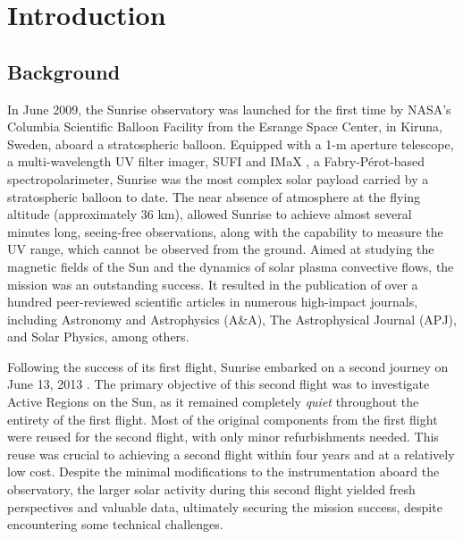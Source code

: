 \chapter{Introduction}

\section{Background}

In June 2009, the Sunrise observatory was launched for the first time \citep{SunriseI} by NASA's Columbia Scientific Balloon Facility from the Esrange Space Center, in Kiruna, Sweden, aboard a stratospheric balloon. Equipped with a 1-m aperture telescope, a multi-wavelength UV filter imager, SUFI \citep{SUFI} and IMaX \citep{IMaX}, a Fabry-Pérot-based spectropolarimeter, Sunrise was the most complex solar payload carried by a stratospheric balloon to date. The near absence of atmosphere at the flying altitude (approximately 36 km), allowed Sunrise to achieve almost several minutes long, seeing-free observations, along with the capability to measure the UV range, which cannot be observed from the ground. Aimed at studying the magnetic fields of the Sun and the dynamics of solar plasma convective flows, the mission was an outstanding success. It resulted in the publication of over a hundred peer-reviewed scientific articles in numerous high-impact journals, including Astronomy and Astrophysics (A\&A), The Astrophysical Journal (APJ), and Solar Physics, among others.

Following the success of its first flight, Sunrise embarked on a second journey  on June 13, 2013 \citep{SunriseII}. The primary objective of this second flight was to investigate Active Regions on the Sun, as it remained completely \textit{quiet} throughout the entirety of the first flight. Most of the original components from the first flight were reused for the second flight, with only minor refurbishments needed. This reuse was crucial to achieving a second flight within four years and at a relatively low cost. Despite the minimal modifications to the instrumentation aboard the observatory, the larger solar activity during this second flight yielded fresh perspectives and valuable data, ultimately securing the mission success, despite encountering some technical challenges.

